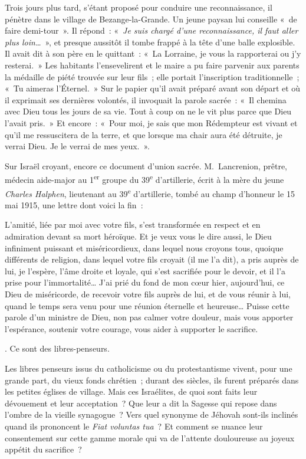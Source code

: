 \documentclass[french,twoside]{book} %
\begin{document}
{ \par
\noindent Trois jours plus tard, s’étant proposé pour conduire une reconnaissance, il pénètre dans le village de Bezange-la-Grande. Un jeune paysan lui conseille « de faire demi-tour ». Il répond : « {\itshape Je suis chargé d’une reconnaissance, il faut aller plus loin…} », et presque aussitôt il tombe frappé à la tête d’une balle explosible. Il avait dit à son père en le quittant : « La Lorraine, je vous la rapporterai ou j’y resterai. » Les habitants l’ensevelirent et le maire a pu faire parvenir aux parents la médaille de piété trouvée sur leur fils ; elle portait l’inscription traditionnelle ; « Tu aimeras l’Éternel. » Sur le papier qu’il avait préparé avant son départ et où il exprimait ses dernières volontés, il invoquait la parole sacrée : « Il chemina avec Dieu tous les jours de sa vie. Tout à coup on ne le vit plus parce que Dieu l’avait pris. » Et encore : « Pour moi, je sais que mon Rédempteur est vivant et qu’il me ressuscitera de la terre, et que lorsque ma chair aura été détruite, je verrai Dieu. Je le verrai de mes yeux. ».‌\par
 Sur Israël croyant, encore ce document d’union sacrée. M. Lancrenion, prêtre, médecin aide-major au 1\textsuperscript{er} groupe du 39\textsuperscript{e} d’artillerie, écrit à la mère du jeune {\itshape Charles Halphen}, lieutenant au 39\textsuperscript{e} d’artillerie, tombé au champ d’honneur le 15 mai 1915, une lettre dont voici la fin :‌\par
  \noindent L’amitié, liée par moi avec votre fils, s’est transformée en respect et en admiration devant sa mort héroïque. Et je veux vous le dire aussi, le Dieu infiniment puissant et miséricordieux, dans lequel nous croyons tous, quoique différents de religion, dans lequel votre fils croyait (il me l’a dit), a pris auprès de lui, je l’espère, l’âme droite et loyale, qui s’est sacrifiée pour le devoir, et il l’a prise pour l’immortalité… J’ai prié du fond de mon cœur hier, aujourd’hui, ce Dieu de miséricorde, de recevoir votre fils auprès de lui, et de vous réunir à lui, quand le temps sera venu pour une réunion éternelle et heureuse… Puisse cette parole d’un ministre de Dieu, non pas calmer votre douleur, mais vous apporter l’espérance, soutenir votre courage, vous aider à supporter le sacrifice.
 }. Ce sont des libres-penseurs.‌\par
\par
Les libres penseurs issus du catholicisme ou du protestantisme vivent, pour une grande part, du vieux fonds chrétien ; durant des siècles, ils furent préparés dans les petites églises de village. Mais ces Israélites, de quoi sont faits leur dévouement et leur acceptation ? Que leur a dit la Sagesse qui repose dans l’ombre de la vieille synagogue ? Vers quel synonyme de Jéhovah sont-ils inclinés quand ils prononcent le {\itshape Fiat voluntas tua} ? Et comment se nuance leur consentement sur cette gamme morale qui va de l’attente douloureuse au joyeux appétit du sacrifice ?‌\par
\end{document}
